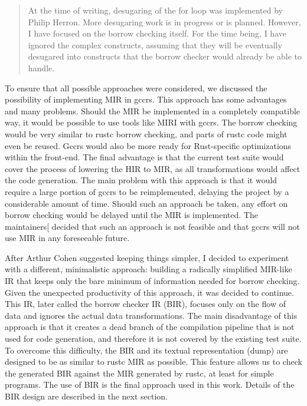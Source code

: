 \documentclass[
  11pt,
  twoside]{report}
\begin{document}
\begin{quote}
At the time of writing, desugaring of the for loop was implemented by
Philip Herron. More desugaring work is in progress or is planned.
However, I have focused on the borrow checking itself. For the time
being, I have ignored the complex constructs, assuming that they will be
eventually desugared into constructs that the borrow checker would
already be able to handle.
\end{quote}

To ensure that all possible approaches were considered, we discussed the
possibility of implementing MIR in gccrs. This approach has some
advantages and many problems. Should the MIR be implemented in a
completely compatible way, it would be possible to use tools like MIRI
with gccrs. The borrow checking would be very similar to rustc borrow
checking, and parts of rustc code might even be reused. Gccrs would also
be more ready for Rust-specific optimizations within the front-end. The
final advantage is that the current test suite would cover the process
of lowering the HIR to MIR, as all transformations would affect the code
generation. The main problem with this approach is that it would require
a large portion of gccrs to be reimplemented, delaying the project by a
considerable amount of time. Should such an approach be taken, any
effort on borrow checking would be delayed until the MIR is implemented.
The maintainers{[}\citeproc{ref-zulip}{15}{]} decided that such an
approach is not feasible and that gccrs will not use MIR in any
foreseeable future.

After Arthur Cohen suggested keeping things simpler, I decided to
experiment with a different, minimalistic approach: building a radically
simplified MIR-like IR that keeps only the bare minimum of information
needed for borrow checking. Given the unexpected productivity of this
approach, it was decided to continue. This IR, later called the borrow
checker IR (BIR), focuses only on the flow of data and ignores the
actual data transformations. The main disadvantage of this approach is
that it creates a dead branch of the compilation pipeline that is not
used for code generation, and therefore it is not covered by the
existing test suite. To overcome this difficulty, the BIR and its
textual representation (dump) are designed to be as similar to rustc MIR
as possible. This feature allows us to check the generated BIR against
the MIR generated by rustc, at least for simple programs. The use of BIR
is the final approach used in this work. Details of the BIR design are
described in the next section.
\end{document}
